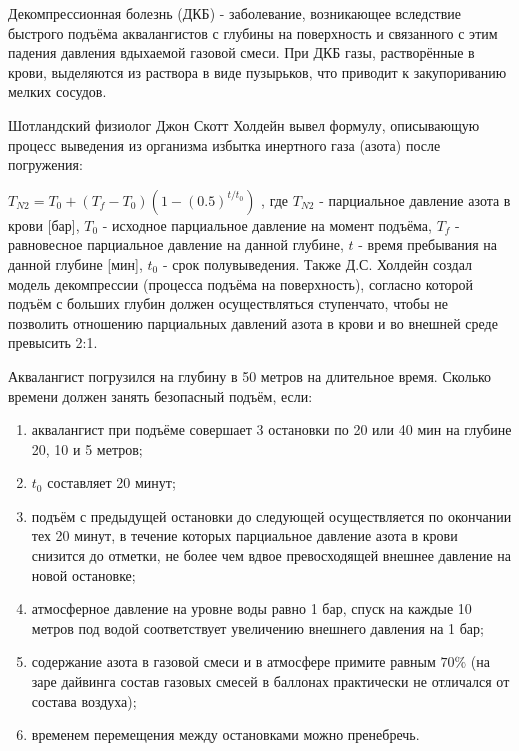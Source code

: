 
Декомпрессионная
болезнь (ДКБ) - заболевание, возникающее вследствие быстрого подъёма
аквалангистов с глубины на поверхность и связанного с этим падения давления
вдыхаемой газовой смеси. При ДКБ газы, растворённые в крови, выделяются из
раствора в виде пузырьков, что приводит к закупориванию мелких сосудов.

Шотландский
физиолог Джон Скотт Холдейн вывел формулу, описывающую процесс выведения из
организма избытка инертного газа (азота) после погружения:

$T_{N2}= T_0 + (T_f - T_0)(1-(0.5)^{t/t_0})$ ,
где $T_{N2}$  - парциальное давление азота в крови [бар], $T_0$ -
исходное парциальное давление на момент подъёма, $T_f$  - равновесное
парциальное давление на данной глубине, $t$  - время пребывания на данной глубине
[мин], $t_0$  - срок полувыведения. Также Д.С. Холдейн создал модель
декомпрессии (процесса подъёма на поверхность), согласно которой подъём с
больших глубин должен осуществляться ступенчато, чтобы не позволить отношению
парциальных давлений азота в крови и во внешней среде превысить 2:1.

Аквалангист
погрузился на глубину в 50 метров на длительное время. Сколько времени должен
занять безопасный подъём, если:

\begin{enumerate}
    \item аквалангист при подъёме совершает 3 остановки по 20 или 40 мин на глубине 20, 10 и 5 метров; 
    \item $t_0$ составляет 20 минут;
    \item подъём с предыдущей остановки до следующей осуществляется по окончании тех 20 минут, в течение которых парциальное давление азота в крови снизится до
отметки, не более чем вдвое превосходящей внешнее давление на новой остановке;
    \item атмосферное давление на уровне воды равно 1 бар, спуск на каждые 10 метров под водой
соответствует увеличению внешнего давления на 1 бар;
    \item содержание азота в газовой смеси и в атмосфере примите равным $70\%$ (на заре
дайвинга состав газовых смесей в баллонах практически не отличался от состава
воздуха);
    \item временем перемещения между остановками можно пренебречь.
\end{enumerate}



